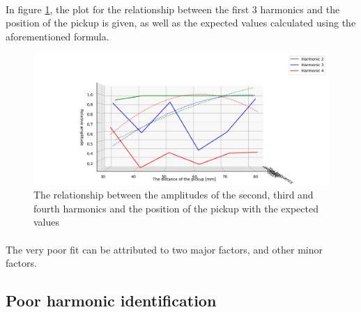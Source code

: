 \documentclass{article}
\begin{document}
\paragraph*{}
In figure \ref{fig:final-graph-e}, the plot for the relationship between the 
first $3$ harmonics and the position of the pickup is given, as well as the 
expected values calculated using the aforementioned formula.
\begin{figure}[ht]
	\centering
	\includegraphics[width=\textwidth]{img/final-graph-e}
	\caption{The relationship between the amplitudes of the second, third and 
		fourth harmonics and the position of the pickup with the expected values}
	\label{fig:final-graph-e}
\end{figure}

\paragraph*{}
The very poor fit can be attributed to two major factors, and other minor 
factors.

\subsection{Poor harmonic identification}
\end{document}
